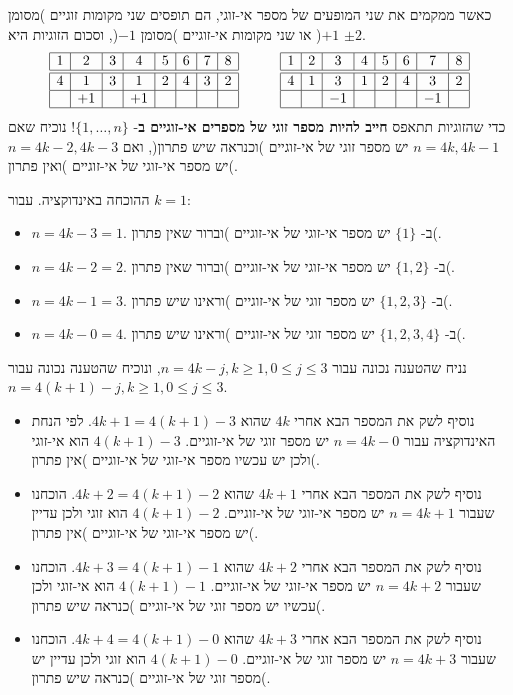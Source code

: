 כאשר ממקמים את שני המופעים של מספר אי-זוגי,  הם תופסים שני מקומות זוגיים )מסומן 
$+1$(
או שני מקומות אי-זוגיים )מסומן 
$-1$(,
וסכום הזוגיות היא
$\pm 2$.
\[
\begin{array}{|c|c|c|c|c|c|c|c|}
\hline
1&2&3&4&5&6&7&8\\
\hline\hline
4&1&3&1&2&4&3&2\\\hline
&+1&&+1&&&&\\\hline
\end{array}
\hspace{3em}
\begin{array}{|c|c|c|c|c|c|c|c|}
\hline
1&2&3&4&5&6&7&8\\
\hline\hline
4&1&3&1&2&4&3&2\\\hline
&&-1&&&&-1&\\\hline
\end{array}
\]
כדי שהזוגיות תתאפס
\textbf{חייב להיות מספר זוגי של מספרים אי-זוגיים ב}-%
$\{1,\ldots,n\}$!
נוכיח שאם 
$n=4k, 4k\!-\!1$
יש מספר זוגי של אי-זוגיים )וכנראה שיש פתרון(,
ואם
$n=4k\!-\!2, 4k\!-\!3$
יש מספר אי-זוגי של אי-זוגיים )ואין פתרון(.

ההוכחה באינדוקציה. עבור 
$k=1$:
\begin{itemize}
\item $n=4k-3=1$.
ב-%
$\{1\}$
יש מספר אי-זוגי של אי-זוגיים )וברור שאין פתרון(.
\item $n=4k-2=2$.
ב-%
$\{1,2\}$
יש מספר אי-זוגי של אי-זוגיים )וברור שאין פתרון(.
\item $n=4k-1=3$.
ב-%
$\{1,2,3\}$
יש מספר זוגי של אי-זוגיים )וראינו שיש פתרון(.
\item $n=4k-0=4$.
ב-%
$\{1,2,3,4\}$
יש מספר זוגי של אי-זוגיים )וראינו שיש פתרון(.
\end{itemize}

נניח שהטענה נכונה עבור 
$n=4k-j, k\geq 1, 0\leq j\leq 3$,
ונוכיח שהטענה נכונה עבור
$n=4(k+1)-j, k\geq 1, 0\leq j\leq 3$.
\begin{itemize}
\item
נוסיף לשק את המספר הבא אחרי 
$4k$
שהוא
$4k+1=4(k+1)-3$.
לפי הנחת האינדוקציה עבור  
$n=4k-0$
יש מספר זוגי של אי-זוגיים. 
$4(k+1)-3$
הוא אי-זוגי ולכן יש עכשיו מספר אי-זוגי של אי-זוגיים )אין פתרון(.

\item
נוסיף לשק את המספר הבא אחרי 
$4k+1$
שהוא
$4k+2=4(k+1)-2$.
הוכחנו שעבור
$n=4k+1$
יש מספר אי-זוגי של אי-זוגיים. 
$4(k+1)-2$
הוא זוגי ולכן עדיין יש מספר אי-זוגי של אי-זוגיים )אין פתרון(.

\item
נוסיף לשק את המספר הבא אחרי 
$4k+2$
שהוא
$4k+3=4(k+1)-1$.
הוכחנו שעבור
$n=4k+2$
יש מספר אי-זוגי של אי-זוגיים. 
$4(k+1)-1$
הוא אי-זוגי ולכן עכשיו יש מספר זוגי של אי-זוגיים )כנראה שיש פתרון(.

\item
נוסיף לשק את המספר הבא אחרי 
$4k+3$
שהוא
$4k+4=4(k+1)-0$.
הוכחנו שעבור
$n=4k+3$
יש מספר זוגי של אי-זוגיים. 
$4(k+1)-0$
הוא זוגי ולכן עדיין יש מספר זוגי של אי-זוגיים )כנראה שיש פתרון(.

\end{itemize}


